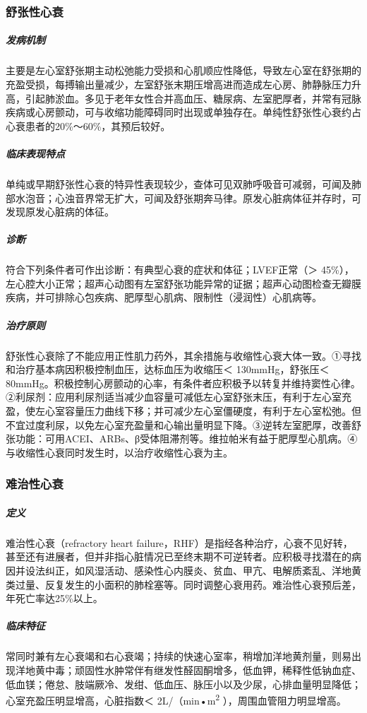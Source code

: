\subsubsection{舒张性心衰}

\subparagraph{发病机制}

主要是左心室舒张期主动松弛能力受损和心肌顺应性降低，导致左心室在舒张期的充盈受损，每搏输出量减少，左室舒张末期压增高进而造成左心房、肺静脉压力升高，引起肺淤血。多见于老年女性合并高血压、糖尿病、左室肥厚者，并常有冠脉疾病或心房颤动，可与收缩功能障碍同时出现或单独存在。单纯性舒张性心衰约占心衰患者的20\%～60\%，其预后较好。

\subparagraph{临床表现特点}

单纯或早期舒张性心衰的特异性表现较少，查体可见双肺呼吸音可减弱，可闻及肺部水泡音；心浊音界常无扩大，可闻及舒张期奔马律。原发心脏病体征并存时，可发现原发心脏病的体征。

\subparagraph{诊断}

符合下列条件者可作出诊断：有典型心衰的症状和体征；LVEF正常（＞
45\%），左心腔大小正常；超声心动图有左室舒张功能异常的证据；超声心动图检查无瓣膜疾病，并可排除心包疾病、肥厚型心肌病、限制性（浸润性）心肌病等。

\subparagraph{治疗原则}

舒张性心衰除了不能应用正性肌力药外，其余措施与收缩性心衰大体一致。①寻找和治疗基本病因积极控制血压，达标血压为收缩压＜
130mmHg，舒张压＜
80mmHg。积极控制心房颤动的心率，有条件者应积极予以转复并维持窦性心律。②利尿剂：应用利尿剂适当减少血容量可减低左心室舒张末压，有利于左心室充盈，使左心室容量压力曲线下移；并可减少左心室僵硬度，有利于左心室松弛。但不宜过度利尿，以免左心室充盈量和心输出量明显下降。③逆转左室肥厚，改善舒张功能：可用ACEI、ARBs、β受体阻滞剂等。维拉帕米有益于肥厚型心肌病。④与收缩性心衰同时发生时，以治疗收缩性心衰为主。

\subsubsection{难治性心衰}

\subparagraph{定义}

难治性心衰（refractory heart
failure，RHF）是指经各种治疗，心衰不见好转，甚至还有进展者，但并非指心脏情况已至终末期不可逆转者。应积极寻找潜在的病因并设法纠正，如风湿活动、感染性心内膜炎、贫血、甲亢、电解质紊乱、洋地黄类过量、反复发生的小面积的肺栓塞等。同时调整心衰用药。难治性心衰预后差，年死亡率达25\%以上。

\subparagraph{临床特征}

常同时兼有左心衰竭和右心衰竭；持续的快速心室率，稍增加洋地黄剂量，则易出现洋地黄中毒；顽固性水肿常伴有继发性醛固酮增多，低血钾，稀释性低钠血症、低血镁；倦怠、肢端厥冷、发绀、低血压、脉压小以及少尿，心排血量明显降低；心室充盈压明显增高，心脏指数＜
2L/（min•m\textsuperscript{2} ），周围血管阻力明显增高。

